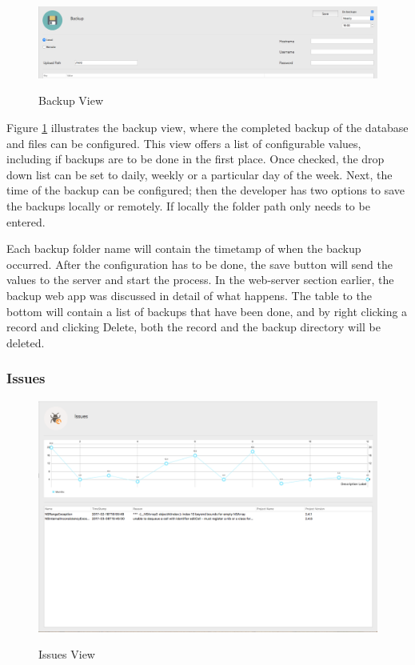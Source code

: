 \begin{figure}[!h]
    \caption{Backup View}
    \centering
    \includegraphics[width=150mm]{images/dashboard/backup}
    \label{fig:backup-view}
\end{figure} 

Figure \ref{fig:backup-view} illustrates the backup view, where the completed backup of the database and files can be configured. This view offers a list of configurable values, including if backups are to be done in the first place. Once checked, the drop down list can be set to daily, weekly or a particular day of the week. Next, the time of the backup can be configured; then the developer has two options to save the backups locally or remotely. If locally the folder path only needs to be entered.

Each backup folder name will contain the timetamp of when the backup occurred. After the configuration has to be done, the save button will send the values to the server and start the process. In the web-server section earlier, the backup web app was discussed in detail of what happens. The table to the bottom will contain a list of backups that have been done, and by right clicking a record and clicking Delete, both the record and the backup directory will be deleted.

\subsubsection{Issues}

\begin{figure}[!h]
    \caption{Issues View}
    \centering
    \includegraphics[width=150mm]{images/dashboard/crashes}
    \label{fig:crashes-view}
\end{figure} 

